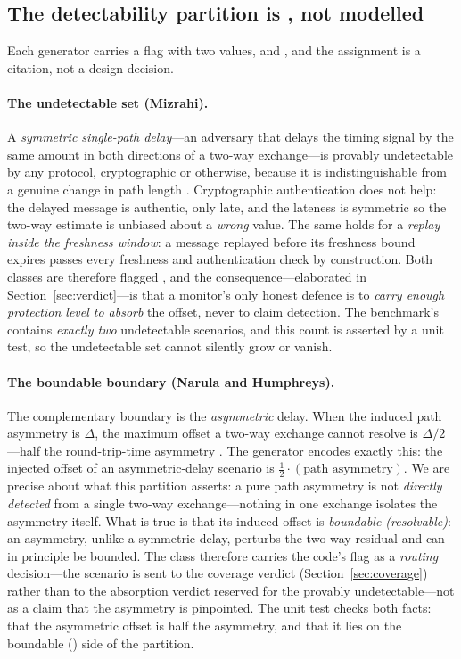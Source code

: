 \subsection{The detectability partition is \Cited{}, not modelled}
\label{sec:detectability}

Each generator carries a  flag with two values,
 and , and the assignment is a citation, not a
design decision.

\paragraph{The undetectable set (Mizrahi).}
A \emph{symmetric single-path delay}---an adversary that delays the timing signal
by the same amount in both directions of a two-way exchange---is provably
undetectable by any protocol, cryptographic or otherwise, because it is
indistinguishable from a genuine change in path length \citep{mizrahi7384}.
Cryptographic authentication does not help: the delayed message is authentic, only
late, and the lateness is symmetric so the two-way estimate is unbiased about a
\emph{wrong} value. The same holds for a \emph{replay inside the freshness
window}: a message replayed before its freshness bound expires passes every
freshness and authentication check by construction. Both classes are therefore
flagged , and the consequence---elaborated in
Section~\ref{sec:verdict}---is that a monitor's only honest defence is to
\emph{carry enough protection level to absorb} the offset, never to claim
detection. The benchmark's  contains \emph{exactly two}
undetectable scenarios, and this count is asserted by a unit test, so the
undetectable set cannot silently grow or vanish.

\paragraph{The boundable boundary (Narula and Humphreys).}
The complementary boundary is the \emph{asymmetric} delay. When the induced path
asymmetry is $\Delta$, the maximum offset a two-way exchange cannot resolve is
$\Delta/2$---half the round-trip-time asymmetry \citep{narula2018}. The generator
encodes exactly this: the injected offset of an asymmetric-delay scenario is
$\tfrac12\cdot(\text{path asymmetry})$. We are precise about what this partition
asserts: a pure path asymmetry is not \emph{directly detected} from a single
two-way exchange---nothing in one exchange isolates the asymmetry itself. What is
true is that its induced offset is \emph{boundable (resolvable)}: an asymmetry,
unlike a symmetric delay, perturbs the two-way residual and can in principle be
bounded. The class therefore carries the code's  flag as a
\emph{routing} decision---the scenario is sent to the coverage verdict
(Section~\ref{sec:coverage}) rather than to the absorption verdict reserved for the
provably undetectable---not as a claim that the asymmetry is pinpointed. The unit
test checks both facts: that the asymmetric offset is half the asymmetry, and that
it lies on the boundable () side of the partition.

